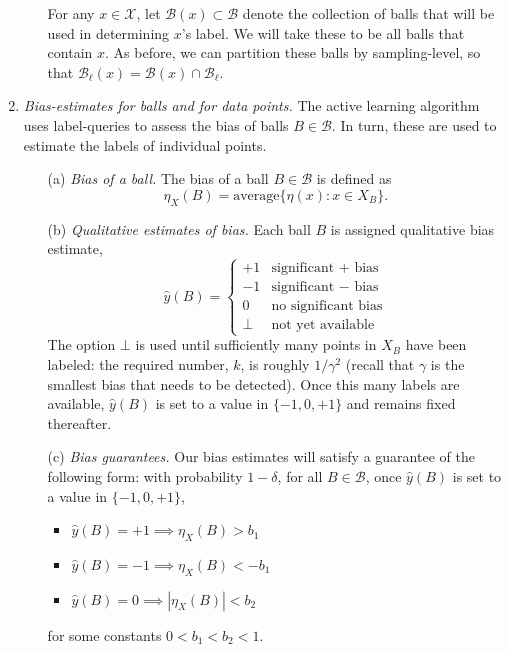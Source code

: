 \documentclass{article}
\def\X{{\mathcal X}}
\def\B{{\mathcal B}}
\def\yh{{\widehat{y}}}
\begin{document}
\begin{enumerate}
\begin{enumerate}
For any $x \in \X$, let $\B(x) \subset \B$ denote the collection of balls that will be used in determining $x$'s label. We will take these to be all balls that contain $x$. As before, we can partition these balls by sampling-level, so that $\B_\ell(x) = \B(x) \cap \B_\ell$.

\end{enumerate}

\item {\it Bias-estimates for balls and for data points.} The active learning algorithm uses label-queries to assess the bias of balls $B \in \B$. In turn, these are used to estimate the labels of individual points.

\begin{enumerate}

\item[(a)] {\it Bias of a ball.} The bias of a ball $B \in \B$ is defined as
$$ \eta_X(B) = \mbox{average}\{\eta(x): x \in X_B \} .$$

\item[(b)] {\it Qualitative estimates of bias.} Each ball $B$ is assigned qualitative bias estimate,
$$ \yh(B) = 
\left\{
\begin{array}{cl}
+1 & \mbox{significant $+$ bias} \\
-1 & \mbox{significant $-$ bias} \\
0 & \mbox{no significant bias} \\
\bot & \mbox{not yet available}
\end{array}
\right.
$$
The option $\bot$ is used until sufficiently many points in $X_B$ have been labeled: the required number, $k$, is roughly $1/\gamma^2$ (recall that $\gamma$ is the smallest bias that needs to be detected). Once this many labels are available, $\yh(B)$ is set to a value in $\{-1,0,+1\}$ and remains fixed thereafter.

\item[(c)] {\it Bias guarantees.} Our bias estimates will satisfy a guarantee of the following form: with probability $1-\delta$, for all $B \in \B$, once $\yh(B)$ is set to a value in $\{-1,0,+1\}$, 
\begin{itemize}
\item $\yh(B) = +1 \implies \eta_X(B) > b_1$
\item $\yh(B) = -1 \implies \eta_X(B) < -b_1$
\item $\yh(B) = 0 \implies |\eta_X(B)| < b_2$
\end{itemize}
for some constants $0 < b_1 < b_2 < 1$.


\end{enumerate}
\end{enumerate}
\end{document}

